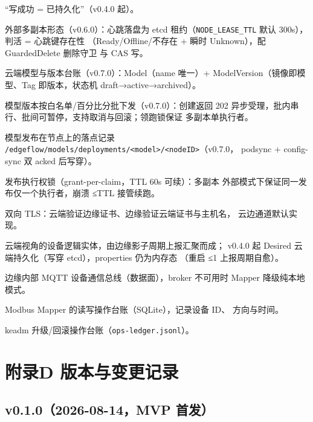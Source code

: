 \begin{description}
        “写成功 = 已持久化”（v0.4.0 起）。
  \item[真多活 / 租约判活] 外部多副本形态（v0.6.0）：心跳落盘为 etcd
        租约（\texttt{NODE\_LEASE\_TTL} 默认 300s），判活 = 心跳键存在性
        （Ready/Offline/不存在 + 瞬时 Unknown），配 GuardedDelete 删除守卫
        与 CAS 写。
  \item[模型仓库] 云端模型与版本台账（v0.7.0）：Model（name 唯一）+
        ModelVersion（镜像即模型、Tag 即版本，状态机
        draft→active→archived）。
  \item[灰度发布] 模型版本按白名单/百分比分批下发（v0.7.0）：创建返回
        202 异步受理，批内串行、批间可暂停，支持取消与回滚；领跑锁保证
        多副本单执行者。
  \item[部署影子] 模型发布在节点上的落点记录
        \texttt{/edgeflow/models/deployments/<model>/<nodeID>}（v0.7.0，
        podsync + config-sync 双 acked 后写穿）。
  \item[领跑锁] 发布执行权锁（grant-per-claim，TTL 60s 可续）：多副本
        外部模式下保证同一发布仅一个执行者，崩溃 ≤TTL 接管续跑。
  \item[mTLS] 双向 TLS：云端验证边缘证书、边缘验证云端证书与主机名，
        云边通道默认实现。
  \item[影子设备] 云端视角的设备逻辑实体，由边缘影子周期上报汇聚而成；
        v0.4.0 起 Desired 云端持久化（写穿 etcd），properties 仍为内存态
        （重启 ≤1 上报周期自愈）。
  \item[EventBus] 边缘内部 MQTT 设备通信总线（数据面），broker 不可用时
        Mapper 降级纯本地模式。
  \item[op-ledger] Modbus Mapper 的读写操作台账（SQLite），记录设备 ID、
        方向与时间。
  \item[ops-ledger] keadm 升级/回滚操作台账（\texttt{ops-ledger.jsonl}）。
\end{description}

\chapter{附录D 版本与变更记录}
\label{app:D}

\section{v0.1.0（2026-08-14，MVP 首发）}

